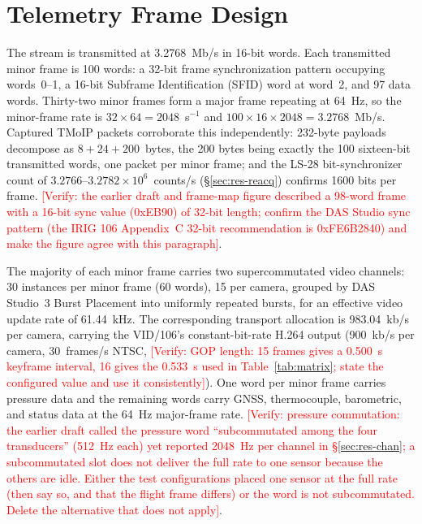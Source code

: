 \documentclass[12pt,letterpaper]{article}
\newcommand{\needsverify}[1]{\textcolor{red}{[Verify: #1]}}
\begin{document}
\section{Telemetry Frame Design}\label{sec:frame}

The stream is transmitted at 3.2768~Mb/s in 16-bit words. Each transmitted minor frame is
100 words: a 32-bit frame synchronization pattern occupying words~0--1, a 16-bit Subframe
Identification (SFID) word at word~2, and 97 data words. Thirty-two minor frames form a
major frame repeating at 64~Hz, so the minor-frame rate is $32 \times 64 = 2048$~s$^{-1}$
and $100 \times 16 \times 2048 = 3.2768$~Mb/s. Captured TMoIP packets corroborate this
independently: 232-byte payloads decompose as $8 + 24 + 200$~bytes, the 200 bytes being
exactly the 100 sixteen-bit transmitted words, one packet per minor frame; and the LS-28
bit-synchronizer count of $3.2766$--$3.2782 \times 10^{6}$~counts/s (\S\ref{sec:res-reacq})
confirms 1600 bits per frame. \needsverify{the earlier draft and frame-map figure described
a 98-word frame with a 16-bit sync value (0xEB90) of 32-bit length; confirm the DAS Studio
sync pattern (the IRIG 106 Appendix~C 32-bit recommendation is 0xFE6B2840) and make the
figure agree with this paragraph}.

The majority of each minor frame carries two supercommutated video channels: 30 instances
per minor frame (60 words), 15 per camera, grouped by DAS Studio~3 Burst Placement into
uniformly repeated bursts, for an effective video update rate of 61.44~kHz. The
corresponding transport allocation is 983.04~kb/s per camera, carrying the VID/106's
constant-bit-rate H.264 output (900~kb/s per camera, 30~frames/s NTSC,
\needsverify{GOP length: 15 frames gives a 0.500~s keyframe interval, 16 gives the 0.533~s
used in Table~\ref{tab:matrix}; state the configured value and use it consistently}).
One word per minor frame carries pressure data and the remaining words carry GNSS,
thermocouple, barometric, and status data at the 64~Hz major-frame rate.
\needsverify{pressure commutation: the earlier draft called the pressure word
``subcommutated among the four transducers'' (512~Hz each) yet reported 2048~Hz per
channel in \S\ref{sec:res-chan}; a subcommutated slot does not deliver the full rate to one
sensor because the others are idle. Either the test configurations placed one sensor at the
full rate (then say so, and that the flight frame differs) or the word is not
subcommutated. Delete the alternative that does not apply}.
\end{document}

